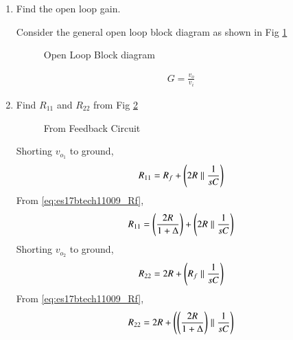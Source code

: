 \begin{enumerate}[label=\arabic*.,ref=\theenumi]
\begin{enumerate}[label=\arabic*.,ref=\theenumi]
\item
Find the open loop gain.

Consider the general open loop block diagram as shown in Fig \ref{fig:es17btech11009_block1}
\renewcommand{\thefigure}{\theenumi.\arabic{figure}}
\begin{figure}[!ht]
	\begin{center}
		\resizebox{\columnwidth}{!}{}
	\end{center}
\caption{Open Loop Block diagram}
\label{fig:es17btech11009_block1}
\end{figure}
\begin{align}
    G = \frac{v_{o}}{v_{i}} 
\end{align}
\item
Find $R_{11}$ and $R_{22}$ from Fig \ref{fig:es17btech11009_R}
\renewcommand{\thefigure}{\theenumi.\arabic{figure}}
\begin{figure}[!ht]
	\begin{center}
		\resizebox{\columnwidth}{!}{}
	\end{center}
\caption{From Feedback Circuit}
\label{fig:es17btech11009_R}
\end{figure}

Shorting $v_{o_1}$ to ground,
\begin{align}
    R_{11} = R_{f} + \left(2R\parallel \frac{1}{sC}\right)
\end{align}
From \eqref{eq:es17btech11009_Rf},
\begin{align}
    R_{11} = \left(\frac{2R}{1+ \Delta}\right) + \left(2R \parallel \frac{1}{sC}\right)
\end{align}
Shorting $v_{o_2}$ to ground,
\begin{align}
    R_{22} = 2R + \left(R_{f}\parallel \frac{1}{sC}\right)
\end{align}
From \eqref{eq:es17btech11009_Rf},
\begin{align}
    R_{22} =  2R + \left(\left(\frac{2R}{1 + \Delta}\right)\parallel \frac{1}{sC}\right)
\end{align}


\end{enumerate}
\end{enumerate}
